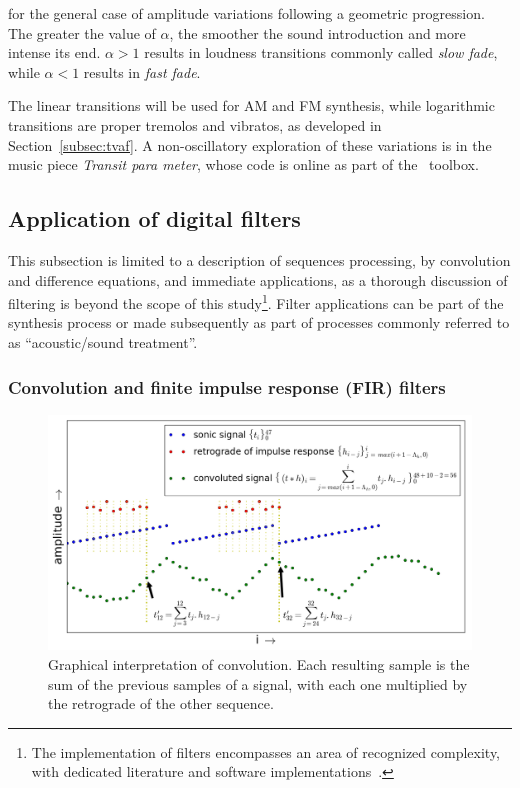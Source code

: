 \noindent for the general case of amplitude variations following a geometric progression. The greater the value of $\alpha$, the smoother the sound introduction and more intense its end. $\alpha>1$ results in loudness transitions commonly called \emph{slow fade}, while $\alpha<1$ results in \emph{fast fade}\cite{guillaume}.

The linear transitions will be used for AM and FM synthesis, while logarithmic transitions are proper tremolos and vibratos, as developed in Section~\ref{subsec:tvaf}. A non-oscillatory exploration of these variations is in the music piece \emph{Transit para meter}, whose code is online as part of the \massa\ toolbox\cite{MASSA}.

\subsection{Application of digital filters}\label{subsec:filtros}
This subsection is limited to a description of sequences processing, by convolution and difference equations, and immediate applications, as a thorough discussion of filtering is beyond the scope of this study\footnote{The implementation of filters encompasses an area of recognized complexity, with dedicated literature and software implementations~\cite{Openheim,smith}.}. Filter applications can be part of the synthesis process or made subsequently as part of processes commonly referred to as ``acoustic/sound treatment''.

\subsubsection{Convolution and finite impulse response (FIR) filters}\label{subsec:conv}
\begin{figure}
     \centering
         \includegraphics[width=\textwidth]{figures/convolucao_}
     \caption{Graphical interpretation of convolution. Each resulting sample is the sum of the previous samples of a signal, with each one multiplied by the retrograde of the other sequence.}
         \label{fig:conv}
\end{figure}

